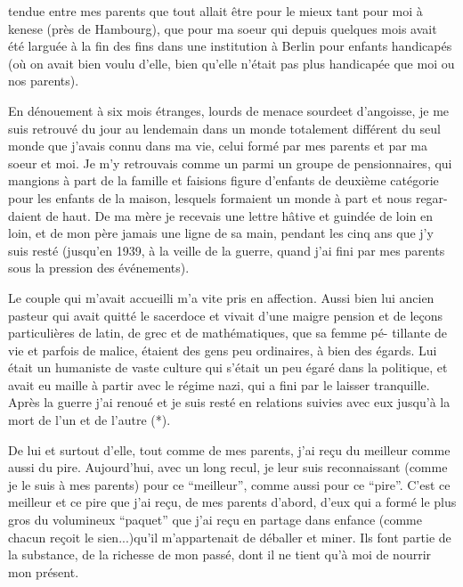 tendue entre mes parents que tout allait être pour le mieux tant pour moi à \newline
kenese (près de Hambourg), que pour ma soeur qui depuis quelques mois avait été
larguée à la fin des fins dans une institution à Berlin pour enfants handicapés
(où on avait bien voulu d'elle, bien qu'elle n'était pas plus handicapée que moi
ou nos parents).

En dénouement à six mois étranges, lourds de menace sourde\quad et d'angoisse,
je me suis retrouvé du jour au lendemain dans un monde totalement différent du
seul monde que j'avais connu dans ma vie, celui formé par mes parents et par ma
soeur et moi. Je m'y retrouvais comme un parmi un groupe de pensionnaires, qui
mangions à part de la famille et faisions figure d'enfants de deuxième catégorie
pour les enfants de la maison, lesquels formaient un monde à part et nous regar-\newline
daient de haut. De ma mère je recevais une lettre hâtive et guindée de loin en
loin, et de mon père jamais une ligne de sa main, pendant les cinq ans que j'y
suis resté (jusqu'en 1939, à la veille de la guerre, quand j'ai fini par 
mes parents sous la pression des événements).

Le couple qui m'avait accueilli m'a vite pris en affection. Aussi bien lui
ancien pasteur qui avait quitté le sacerdoce et vivait d'une maigre pension et
de leçons particulières de latin, de grec et de mathématiques, que sa femme pé-\newline
tillante de vie et parfois de malice, étaient des gens peu ordinaires, 
à bien des égards. Lui était un humaniste de vaste culture qui s'était un peu
égaré dans la politique, et avait eu maille à partir avec le régime nazi, qui a
fini par le laisser tranquille. Après la guerre j'ai renoué et je suis resté en
relations suivies avec eux jusqu'à la mort de l'un et de l'autre (*).

De lui et surtout d'elle, tout comme de mes parents, j'ai reçu du meilleur
comme aussi du pire. Aujourd'hui, avec un long recul, je leur suis reconnaissant
(comme je le suis à mes parents) pour ce ``meilleur'', comme aussi pour ce ``pire''.
C'est ce meilleur et ce pire que j'ai reçu, de mes parents d'abord, d'eux 
qui a formé le plus gros du volumineux ``paquet'' que j'ai reçu en partage dans 
enfance (comme chacun reçoit le sien...)\inserted{,}qu'il m'appartenait de déballer et \newline
miner. Ils font partie de la substance, de la richesse de mon passé, dont il ne
tient qu'à moi de nourrir mon présent.

